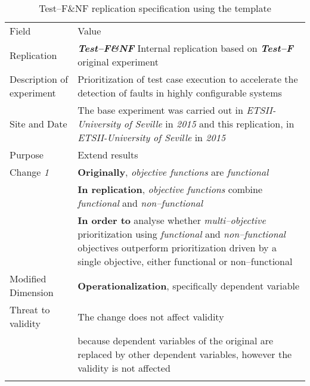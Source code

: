 \begin{table*}[h]
  \caption{Test--F\&NF replication specification using the template}
\label{tab:jap}
  \centering

\begin{tabularx}{\textwidth}{
  >{\hsize=0.25\hsize}X
  >{\hsize=0.8\hsize}X}
  
    \noalign{\smallskip}\hline\noalign{\smallskip}
  
  Field &  Value  \\ 
  \noalign{\smallskip}\hline\noalign{\smallskip}
 
 Replication &   \textbf{\emph{Test--F\&NF}}   Internal replication based on \textbf{\emph{Test--F}}  original experiment   \\

 Description \newline of experiment &  Prioritization of test case execution to accelerate the detection of faults in highly configurable systems \\  
 
 Site and Date & The  base  experiment  was  carried  out  in \textit{ETSII-University of Seville} in \textit{2015} and this replication, in \textit{ETSII-University of Seville} in \textit{2015}  \\
    Purpose  &  Extend results \\  
\hline   
    Change \textit{1}   & \textbf{Originally}, \emph{objective functions} are \emph{functional} \\ & \textbf{In replication},  \emph{objective functions} combine \emph{functional} and \emph{non--functional } \\& \textbf{In order to} analyse whether \emph{multi–objective} prioritization using \emph{functional} and  \emph{non–functional} objectives outperform prioritization driven by a single objective, either functional or non--functional \\ 
    
    Modified Dimension & 
    \textbf{Operationalization}, specifically dependent variable \\   
    Threat to validity  &  The change does not affect validity \\
    & because dependent variables of the original are replaced by other dependent variables, however the validity is not affected
 \\ 
	
   	\noalign{\smallskip\smallskip}\hline
	\end{tabularx}  
\end{table*}
